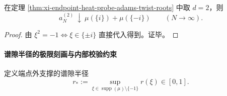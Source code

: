 \begin{corollary}[半角纤维的可核验质量]\label{cor:xi-endpoint-heat-probe-adams-twist-halfangle}
在定理 \ref{thm:xi-endpoint-heat-probe-adams-twist-roots} 中取 \(d=2\)，则
\[
a_N^{(2)}\ \downarrow\ \mu(\{i\})+\mu(\{-i\})\qquad(N\to\infty).
\]
\end{corollary}
\begin{proof}
由 \(\xi^2=-1\iff \xi\in\{\pm i\}\) 直接代入得到。证毕。
\end{proof}
\fi
\paragraph{谱隙半径的极限刻画与内部校验约束}
定义端点外支撑的谱隙半径
\begin{equation}\label{eq:xi-endpoint-heat-probe-rstar-def}
\boxed{\;
r_\ast:=\sup_{\xi\in\operatorname{supp}(\mu)\setminus\{-1\}}r(\xi)\in[0,1].\;}
\end{equation}

